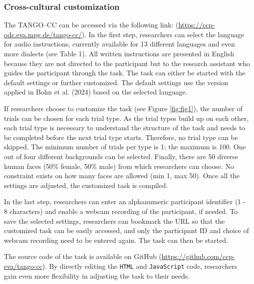 \documentclass[
  man,floatsintext]{apa7}
\begin{document}
\subsubsection{Cross-cultural customization}\label{cross-cultural-customization}

The TANGO--CC can be accessed via the following link: (\url{https://ccp-odc.eva.mpg.de/tango-cc/}).
In the first step, researchers can select the language for audio instructions, currently available for 13 different languages and even more dialects (see Table 1).
All written instructions are presented in English because they are not directed to the participant but to the research assistant who guides the participant through the task.
The task can either be started with the default settings or further customized.
The default settings use the version applied in Bohn et al. (2024) based on the selected language.

If researchers choose to customize the task (see Figure \ref{fig:fig1}), the number of trials can be chosen for each trial type.
As the trial types build up on each other, each trial type is necessary to understand the structure of the task and needs to be completed before the next trial type starts.
Therefore, no trial type can be skipped.
The minimum number of trials per type is 1; the maximum is 100.
One out of four different backgrounds can be selected.
Finally, there are 50 diverse human faces (50\% female, 50\% male) from which researchers can choose.
No constraint exists on how many faces are allowed (min 1, max 50).
Once all the settings are adjusted, the customized task is compiled.

In the last step, researchers can enter an alphanumeric participant identifier (1 - 8 characters) and enable a webcam recording of the participant, if needed.
To save the selected settings, researchers can bookmark the URL so that the customized task can be easily accessed, and only the participant ID and choice of webcam recording need to be entered again.
The task can then be started.

The source code of the task is available on GitHub (\url{https://github.com/ccp-eva/tango-cc}).
By directly editing the \texttt{HTML} and \texttt{JavaScript} code, researchers gain even more flexibility in adjusting the task to their needs.
\end{document}
